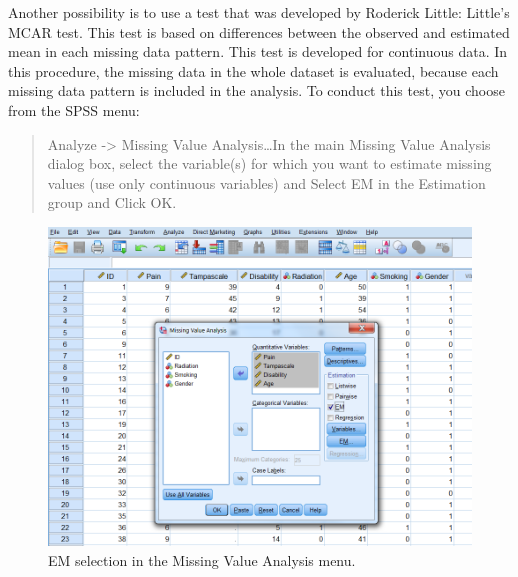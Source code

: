 \documentclass[]{book}
\begin{document}
Another possibility is to use a test that was developed by Roderick
Little: Little's MCAR test. This test is based on differences between
the observed and estimated mean in each missing data pattern. This test
is developed for continuous data. In this procedure, the missing data in
the whole dataset is evaluated, because each missing data pattern is
included in the analysis. To conduct this test, you choose from the SPSS
menu:

\begin{quote}
Analyze -\textgreater{} Missing Value Analysis\ldots{}In the main
Missing Value Analysis dialog box, select the variable(s) for which you
want to estimate missing values (use only continuous variables) and
Select EM in the Estimation group and Click OK.
\end{quote}

\begin{figure}

{\centering \includegraphics[width=0.9\linewidth]{images/fig2.12} 

}

\caption{EM selection in the Missing Value Analysis menu.}\label{fig:fig40}
\end{figure}
\end{document}
